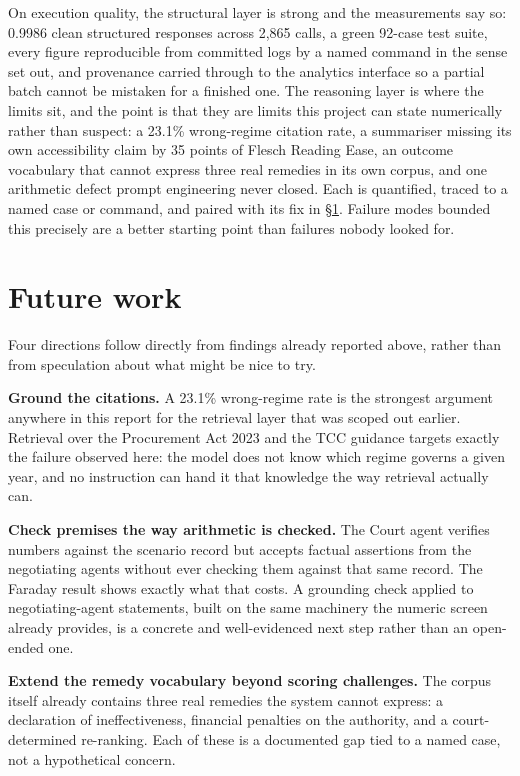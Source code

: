 On execution quality, the structural layer is strong and the measurements say so:
0.9986 clean structured responses across 2{,}865 calls, a green 92-case test
suite, every figure reproducible from committed logs by a named command in the
sense \citet{pineau2021improving} set out, and provenance carried through to the
analytics interface so a partial batch cannot be mistaken for a finished one. The
reasoning layer is where the limits sit, and the point is that they are limits
this project can state numerically rather than suspect: a 23.1\% wrong-regime
citation rate, a summariser missing its own accessibility claim by 35 points of
Flesch Reading Ease, an outcome vocabulary that cannot express three real remedies
in its own corpus, and one arithmetic defect prompt engineering never closed. Each
is quantified, traced to a named case or command, and paired with its fix in
\S\ref{sec:future}. Failure modes bounded this precisely are a better starting
point than failures nobody looked for.

\section{Future work}
\label{sec:future}

Four directions follow directly from findings already reported above, rather
than from speculation about what might be nice to try.

\textbf{Ground the citations.} A 23.1\% wrong-regime rate is the strongest
argument anywhere in this report for the retrieval layer that was scoped out
earlier. Retrieval over the Procurement Act 2023 and the TCC guidance targets
exactly the failure observed here: the model does not know which regime
governs a given year, and no instruction can hand it that knowledge the way
retrieval actually can.

\textbf{Check premises the way arithmetic is checked.} The Court agent verifies
numbers against the scenario record but accepts factual assertions from the
negotiating agents without ever checking them against that same record. The
Faraday result shows exactly what that costs. A grounding check applied to
negotiating-agent statements, built on the same machinery the numeric screen
already provides, is a concrete and well-evidenced next step rather than an
open-ended one.

\textbf{Extend the remedy vocabulary beyond scoring challenges.} The corpus
itself already contains three real remedies the system cannot express: a
declaration of ineffectiveness, financial penalties on the authority, and a
court-determined re-ranking. Each of these is a documented gap tied to a named
case, not a hypothetical concern.

